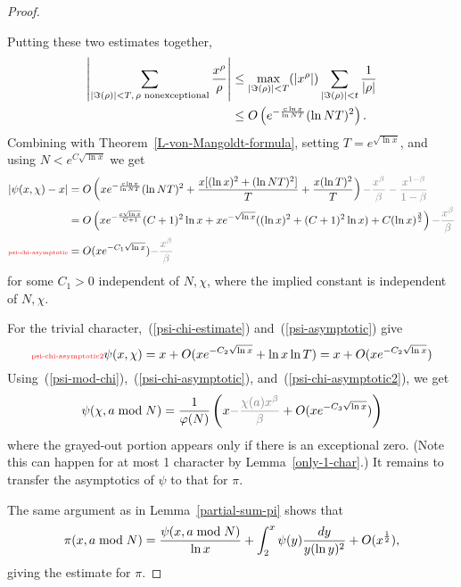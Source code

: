 \begin{proof}
\begin{enumerate}
\end{enumerate}
Putting these two estimates together,
\begin{align*}
\left| {\sum_{|\Im(\rho)|<T,\,\rho\text{ nonexceptional}}\frac{x^{\rho}}{\rho}} \right|
&\le \max_{|\Im(\rho)|<T}(|x^{\rho}|)\sum_{|\Im(\rho)|<t}\frac{1}{|\rho|}\\
&\le O\left( {e^{-\frac{c\ln x}{\ln NT}}(\ln NT)^2} \right).
\end{align*}
Combining with Theorem~\ref{L-von-Mangoldt-formula}, setting $T=e^{\sqrt{\ln x}}$, %
and using $N<e^{C\sqrt{\ln x}}$ we get 
\begin{align}
\nonumber
|\psi(x,\chi)-x|&
= O\pa{
xe^{-\frac{c\ln x}{\ln NT}}(\ln NT)^2+\frac{x[(\ln x)^2+(\ln NT)^2]}{T}+\frac{x(\ln T)^2}{T}
}{\color{gray}-\frac{x^{\be}}{\be}-\fc{x^{1-\be}}{1-\be}}\\
\nonumber
&=O\pa{
xe^{-\fc{c\sqrt{\ln x}}{C+1}}(C+1)^2\ln x +xe^{-\sqrt{\ln x}}((\ln x)^2+(C+1)^2\ln x) +C(\ln x)^{\fc 32}
}{\color{gray}-\frac{x^{\be}}{\be}}\\
\llabel{psi-chi-asymptotic}
&=O(xe^{-C_1\sqrt{\ln x}}){\color{gray}-\frac{x^{\be}}{\be}}
\end{align}
for some $C_1>0$ independent of $N,\chi$, where the implied constant is independent of $N,\chi$.

For the trivial character,~(\ref{psi-chi-estimate}) and~(\ref{psi-asymptotic}) give
\begin{equation}\llabel{psi-chi-asymptotic2}
\psi(x,\chi)=x+O(xe^{-C_2\sqrt{\ln x}}+\ln x\ln T)=x+O(xe^{-C_2\sqrt{\ln x}})
\end{equation}
Using~(\ref{psi-mod-chi}),~(\ref{psi-chi-asymptotic}), and~(\ref{psi-chi-asymptotic2}), we get
\[
\psi(\chi,a\bmod N)=\rc{\ph(N)}\pa{x{\color{gray} -\fc{\chi(a)x^{\be}}{\be}}+O(xe^{-C_3\sqrt{\ln x}})}
\]
where the grayed-out portion appears only if there is an exceptional zero. (Note this can happen for at most 1 character by Lemma~\ref{only-1-char}.) It remains to transfer the asymptotics of $\psi$ to that for $\pi$.

The same argument as in Lemma~\ref{partial-sum-pi} shows that
\[
\pi(x,a\bmod N)=\frac{\psi(x,a\bmod N)}{\ln x}+\int_2^x\psi(y)\frac{dy}{y(\ln y)^2}+O(x^{\frac{1}{2}}),
\]
giving the estimate for $\pi$.
\end{proof}

